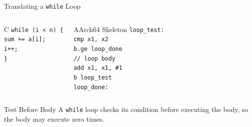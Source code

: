 \documentclass[aspectratio=169,11pt,t]{beamer}
\newcommand{\code}[1]{\texttt{#1}}
\begin{document}

\begin{frame}{Translating a \code{while} Loop}
\begin{columns}[T,onlytextwidth]
\begin{block}{C}
\small
\hspace{0.4cm}\code{while (i < n) \{}\\[0.08cm]
\hspace{0.8cm}\code{sum += a[i];}\\[0.08cm]
\hspace{0.8cm}\code{i++;}\\[0.08cm]
\hspace{0.4cm}\code{\}}
\end{block}
\begin{block}{AArch64 Skeleton}
\small
\hspace{0.5cm}\code{loop\_test:}\\[0.08cm]
\hspace{1.0cm}\code{cmp x1, x2}\\[0.08cm]
\hspace{1.0cm}\code{b.ge loop\_done}\\[0.08cm]
\hspace{1.0cm}\code{// loop body}\\[0.08cm]
\hspace{1.0cm}\code{add x1, x1, \#1}\\[0.08cm]
\hspace{1.0cm}\code{b loop\_test}\\[0.08cm]
\hspace{0.5cm}\code{loop\_done:}
\end{block}
\end{columns}
\vspace{0.15cm}
\begin{block}{Test Before Body}
A \code{while} loop checks its condition before executing the body, so the body may execute zero times.
\end{block}
\end{frame}



\end{document}
